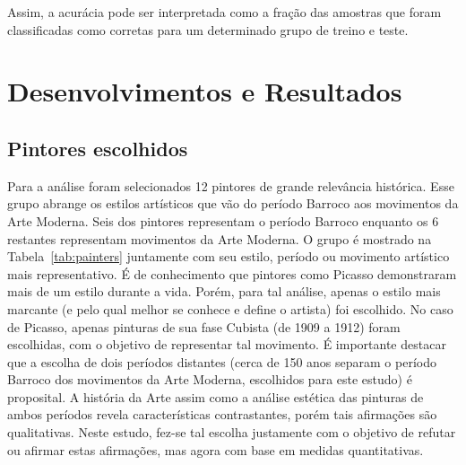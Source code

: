 Assim, a acurácia pode ser interpretada como a fração das amostras que
foram classificadas como corretas para um determinado grupo de treino
e teste.


\afterpage{\blankpage}
\chapter{Desenvolvimentos e Resultados}
\label{chap:resultados}


\section{Pintores escolhidos}

Para a análise foram selecionados 12 pintores de grande relevância
histórica. Esse grupo abrange os estilos artísticos que vão do período
Barroco aos movimentos da Arte Moderna. Seis dos pintores representam
o período Barroco enquanto os 6 restantes representam movimentos da
Arte Moderna. O grupo é mostrado na Tabela~\ref{tab:painters}
juntamente com seu estilo, período ou movimento artístico mais
representativo. É de conhecimento que pintores como Picasso
demonstraram mais de um estilo durante a vida. Porém, para tal
análise, apenas o estilo mais marcante (e pelo qual melhor se conhece
e define o artista) foi escolhido. No caso de Picasso, apenas pinturas
de sua fase Cubista (de 1909 a 1912) foram escolhidas, com o objetivo
de representar tal movimento. É importante destacar que a escolha de
dois períodos distantes (cerca de 150 anos separam o período Barroco
dos movimentos da Arte Moderna, escolhidos para este estudo) é
proposital. A história da Arte assim como a análise estética das
pinturas de ambos períodos revela características contrastantes, porém
tais afirmações são qualitativas. Neste estudo, fez-se tal escolha
justamente com o objetivo de refutar ou afirmar estas afirmações, mas
agora com base em medidas quantitativas.

